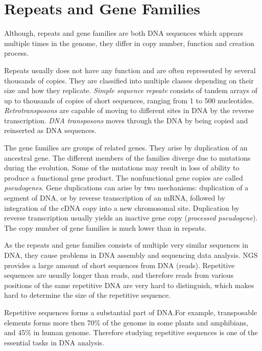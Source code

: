 \chapter{Repeats and Gene Families}\label{chap:repeatsfamilies}

Although, repeats and gene families are both DNA sequences which appears multiple times in the genome, they differ in copy number, function and creation process.

Repeats usually does not have any function and are often represented by several thousands of copies\cite{cell}. They are classified into multiple classes depending on their size and how they replicate.
\emph{Simple sequence repeate} consists of tandem arrays of up to thousands of copies of short sequences, ranging from 1 to 500 nucleotides.
\emph{Retrotransposons} are capable of moving to different sites in DNA by the reverse transcription.
\emph{DNA transposons} moves through the DNA by being copied and reinserted as DNA sequences\cite{cell}.

The gene families are groups of related genes. They arise by duplication of an ancestral gene. The different members of the families diverge due to mutations during the evolution. Some of the mutations may result in loss of ability to produce a functional gene product. The nonfunctional gene copies are called \emph{pseudogenes}.
Gene duplications can arise by two mechanisms: duplication of a segment of DNA, or by reverse transcription of an mRNA, followed by integration of the cDNA copy into a new chromosomal site.
Duplication by reverse transcription usually yields an inactive gene copy (\emph{processed pseudogene}).
The copy number of gene families is much lower than in repeats.

As the repeats and gene families consists of multiple very similar sequences in DNA, they cause problems in DNA assembly and sequencing data analysis. NGS provides a large amount of short sequences from DNA (reads). Repetitive sequences are usually longer than reads, and therefore reads from various positions of the same repetitive DNA are very hard to distinguish, which makes hard to determine the size of the repetitive sequence.

Repetitive sequences forms a substantial part of DNA.\@ For example,
transposable elements forms more then 70\% of the genome in some plants and amphibians, and 45\% in human genome\cite{biemont2006genetics}.
Therefore studying repetitive sequences is one of the essential tasks in DNA analysis.

